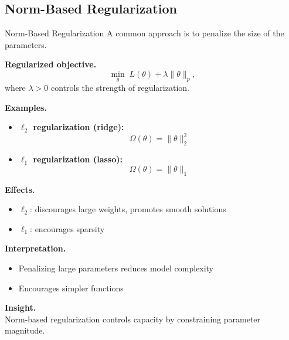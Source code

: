 \documentclass[aspectratio=169,11pt]{beamer}
\begin{document}
\subsection{Norm-Based Regularization}
\begin{frame}[t,allowframebreaks]{Norm-Based Regularization}
\small
A common approach is to penalize the size of the parameters.

\textbf{Regularized objective.}\\ \[
\min_\theta \; L(\theta) + \lambda \|\theta\|_p,
\]
where $\lambda > 0$ controls the strength of regularization.

\textbf{Examples.}\\ \begin{itemize}
    \item \textbf{$\ell_2$ regularization (ridge):}\\ \[
    \Omega(\theta) = \|\theta\|_2^2
    \]

    \item \textbf{$\ell_1$ regularization (lasso):}\\ \[
    \Omega(\theta) = \|\theta\|_1
    \]
\end{itemize}

\textbf{Effects.}\\ \begin{itemize}
    \item $\ell_2$: discourages large weights, promotes smooth solutions
    \item $\ell_1$: encourages sparsity
\end{itemize}

\textbf{Interpretation.}\\ \begin{itemize}
    \item Penalizing large parameters reduces model complexity
    \item Encourages simpler functions
\end{itemize}

\textbf{Insight.}\\ Norm-based regularization controls capacity by constraining parameter magnitude.
\end{frame}
\end{document}
